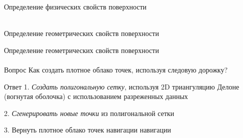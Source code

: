 \documentclass[aspectratio=169,xcolor=table]{beamer}
\begin{document}
\begin{frame}[t]{Определение физических свойств поверхности}
\begin{columns}[T,onlytextwidth]
\begin{column}{0.35\textwidth}

        \end{column}
    \end{columns}
\end{frame}


\begin{frame}[c]{}
    \framesubtitle{}
    \centering\LARGE Определение геометрических свойств поверхности
\end{frame}

\begin{frame}[t]{Определение геометрических свойств поверхности}
    \framesubtitle{}
    {\large\begin{block}{Вопрос}
            Как создать плотное облако точек, используя следовую дорожку?
        \end{block}}
    {\large\begin{alertblock}{Ответ}
            1. \textit{Создать полигональную сетку}, используя 2D триангуляцию Делоне (вогнутая оболочка) с использованием разреженных данных

            2. \textit{Сгенерировать новые точки} из полигональной сетки

            3. Вернуть плотное облако точек навигации навигации
        \end{alertblock}}
\end{frame}
\end{document}
